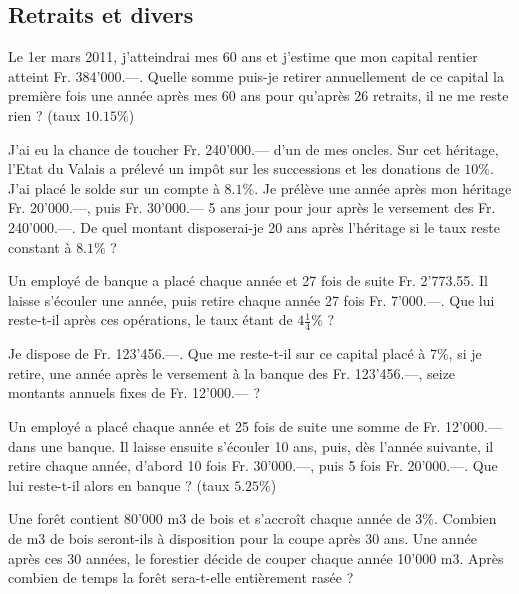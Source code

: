 \subsection{Retraits et divers}

\begin{exercice}
Le 1er mars 2011, j’atteindrai mes 60 ans et j’estime que mon capital rentier atteint Fr. 384'000.—. Quelle somme puis-je retirer annuellement de ce capital la première fois une année après mes 60 ans pour qu’après 26 retraits, il ne me reste rien ? (taux $10.15 \%$) 
\end{exercice}

\begin{exercice}
J’ai eu la chance de toucher Fr. 240'000.— d’un de mes oncles. Sur cet héritage, l’Etat du Valais a prélevé un impôt sur les successions et les donations de $10 \%$. J’ai placé le solde sur un compte à $8.1 \%$.
	Je prélève une année après mon héritage Fr. 20'000.—, puis Fr. 30'000.— 5 ans jour pour jour après le versement des Fr. 240'000.—. De quel montant disposerai-je 20 ans après l’héritage si le taux reste constant à $8.1 \%$ ?
\end{exercice}

\begin{exercice}
Un employé de banque a placé chaque année et 27 fois de suite Fr. 2'773.55. Il laisse s’écouler une année, puis retire chaque année 27 fois Fr. 7'000.—. Que lui reste-t-il après ces opérations, le taux étant de $4\frac{1}{4} \%$ ?
\end{exercice}

\begin{exercice}
Je dispose de Fr. 123'456.—. Que me reste-t-il sur ce capital placé à $7\%$, si je retire, une année après le versement à la banque des Fr. 123'456.—, seize montants annuels fixes de Fr. 12'000.— ?
\end{exercice}

\begin{exercice}
Un employé a placé chaque année et 25 fois de suite une somme de Fr. 12'000.— dans une banque. Il laisse ensuite s’écouler 10 ans, puis, dès l’année suivante, il retire chaque année, d’abord 10 fois Fr. 30'000.—, puis 5 fois Fr. 20'000.––. Que lui reste-t-il alors en banque ? (taux $5.25 \%$)
\end{exercice}

\begin{exercice}
Une forêt contient 80'000 m3 de bois et s’accroît chaque année de $3 \%$. Combien de m3 de bois seront-ils à disposition pour la coupe après 30 ans. Une année après ces 30 années, le forestier décide de couper chaque année 10'000 m3. Après combien de temps la forêt sera-t-elle entièrement rasée ?
\end{exercice}

